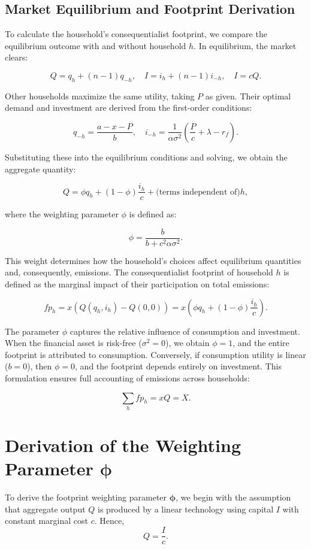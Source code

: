 \documentclass[12pt,a4paper]{article}%
\begin{document}
\subsection*{Market Equilibrium and Footprint Derivation}

To calculate the household's consequentialist footprint, we compare the equilibrium outcome with and without household $h$. In equilibrium, the market clears:

\[
Q = q_h + (n - 1) q_{-h}, \quad I = i_h + (n - 1) i_{-h}, \quad I = cQ.
\]

Other households maximize the same utility, taking $P$ as given. Their optimal demand and investment are derived from the first-order conditions:

\[
q_{-h} = \frac{a - x - P}{b}, \quad i_{-h} = \frac{1}{\alpha \sigma^2} \left( \frac{P}{c} + \lambda - r_f \right).
\]

Substituting these into the equilibrium conditions and solving, we obtain the aggregate quantity:

\[
Q = \phi q_h + (1 - \phi) \frac{i_h}{c} + \text{(terms independent of)} h,
\]

where the weighting parameter $\phi$ is defined as:

\[
\phi = \frac{b}{b + c^2 \alpha \sigma^2}.
\]

This weight determines how the household’s choices affect equilibrium quantities and, consequently, emissions. The consequentialist footprint of household $h$ is defined as the marginal impact of their participation on total emissions:

\[
fp_h = x \left( Q(q_h, i_h) - Q(0, 0) \right) = x \left( \phi q_h + (1 - \phi) \frac{i_h}{c} \right).
\]


The parameter $\phi$ captures the relative influence of consumption and investment. When the financial asset is risk-free ($\sigma^2 = 0$), we obtain $\phi = 1$, and the entire footprint is attributed to consumption. Conversely, if consumption utility is linear ($b = 0$), then $\phi = 0$, and the footprint depends entirely on investment. This formulation ensures full accounting of emissions across households:

\[
\sum_h fp_h = xQ = X.
\]
\section{Derivation of the Weighting Parameter \( \boldsymbol{\phi} \)}

To derive the footprint weighting parameter \( \boldsymbol{\phi} \), we begin with the assumption that aggregate output \( Q \) is produced by a linear technology using capital \( I \) with constant marginal cost \( c \). Hence,
\[
Q = \frac{I}{c}.
\]
\end{document}

